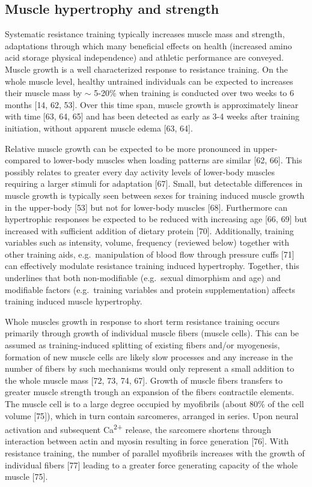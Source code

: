 \documentclass[twoside,10pt]{gihclass} %
\begin{document}
\hypertarget{muscle-hypertrophy-and-strength}{%
\subsection{Muscle hypertrophy and strength}\label{muscle-hypertrophy-and-strength}}

Systematic resistance training typically increases muscle mass and strength, adaptations through which many beneficial effects on health (increased amino acid storage physical independence) and athletic performance are conveyed.
Muscle growth is a well characterized response to resistance training.
On the whole muscle level, healthy untrained individuals can be expected to increases their muscle mass by \(\sim\) 5-20\% when training is conducted over two weeks to 6 months
{[}14, 62, 53{]}.
Over this time span, muscle growth is approximately linear with time
{[}63, 64, 65{]}
and has been detected as early as 3-4 weeks after training initiation, without apparent muscle edema
{[}63, 64{]}.

Relative muscle growth can be expected to be more pronounced in upper- compared to lower-body muscles when loading patterns are similar
{[}62, 66{]}.
This possibly relates to greater every day activity levels of lower-body muscles requiring a larger stimuli for adaptation
{[}67{]}.
Small, but detectable differences in muscle growth is typically seen between sexes for training induced muscle growth in the upper-body
{[}53{]}
but not for lower-body muscles
{[}68{]}.
Furthermore can hypertrophic responses be expected to be reduced with increasing age
{[}66, 69{]}
but increased with sufficient addition of dietary protein
{[}70{]}.
Additionally, training variables such as intensity, volume, frequency (reviewed below) together with other training aids, e.g.~manipulation of blood flow through pressure cuffs
{[}71{]}
can effectively modulate resistance training induced hypertrophy.
Together, this underlines that both non-modifiable (e.g.~sexual dimorphism and age) and modifiable factors (e.g.~training variables and protein supplementation) affects training induced muscle hypertrophy.

Whole muscles growth in response to short term resistance training occurs primarily through growth of individual muscle fibers (muscle cells).
This can be assumed as training-induced splitting of existing fibers and/or myogenesis, formation of new muscle cells are likely slow processes and any increase in the number of fibers by such mechanisms would only represent a small addition to the whole muscle mass
{[}72, 73, 74, 67{]}.
Growth of muscle fibers transfers to greater muscle strength trough an expansion of the fibers contractile elements.
The muscle cell is to a large degree occupied by myofibrils
(about 80\% of the cell volume
{[}75{]}),
which in turn contain sarcomeres, arranged in series.
Upon neural activation and subsequent Ca\textsuperscript{2+} release, the sarcomere shortens through interaction between actin and myosin resulting in force generation
{[}76{]}.
With resistance training, the number of parallel myofibrils increases with the growth of individual fibers
{[}77{]}
leading to a greater force generating capacity of the whole muscle
{[}75{]}.
\end{document}
